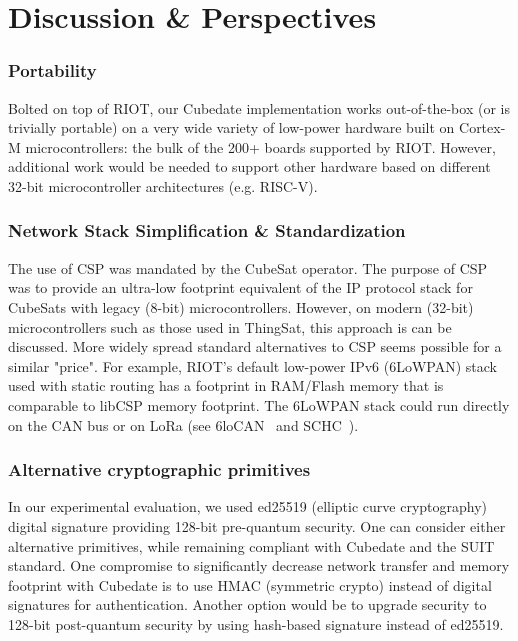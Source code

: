 \section{Discussion \& Perspectives}

\subsubsection{Portability} Bolted on top of RIOT, our Cubedate implementation works out-of-the-box
(or is trivially portable) on a very wide variety of low-power hardware built on Cortex-M microcontrollers:
the bulk of the 200+ boards supported by RIOT. However, additional work would be needed to support
other hardware based on different 32-bit microcontroller architectures (e.g. RISC-V).

\subsubsection{Network Stack Simplification \& Standardization}
The use of CSP was mandated by the CubeSat operator. The purpose of CSP was to provide an ultra-low
footprint equivalent of the IP protocol stack for CubeSats with legacy (8-bit) microcontrollers.
However, on modern (32-bit) microcontrollers such as those used in ThingSat, this approach is can be discussed.
More widely spread standard alternatives to CSP seems possible for a similar "price".
For example, RIOT's default low-power IPv6 (6LoWPAN) stack used with static routing has a footprint
in RAM/Flash memory that is comparable to libCSP memory footprint. The 6LoWPAN stack
could run directly on the CAN bus or on LoRa (see 6loCAN~\cite{wachter20206locan01}
and SCHC~\cite{rfc8724}).

\subsubsection{Alternative cryptographic primitives}
In our experimental evaluation, we used ed25519 (elliptic curve cryptography) digital signature
providing 128-bit pre-quantum security. One can consider either alternative primitives, while
remaining compliant with Cubedate and the SUIT standard. One compromise to significantly decrease
network transfer and memory footprint with Cubedate is to use HMAC (symmetric crypto) instead of
digital signatures for authentication. Another option would be to upgrade security to 128-bit
post-quantum security by using hash-based signature instead of ed25519.
